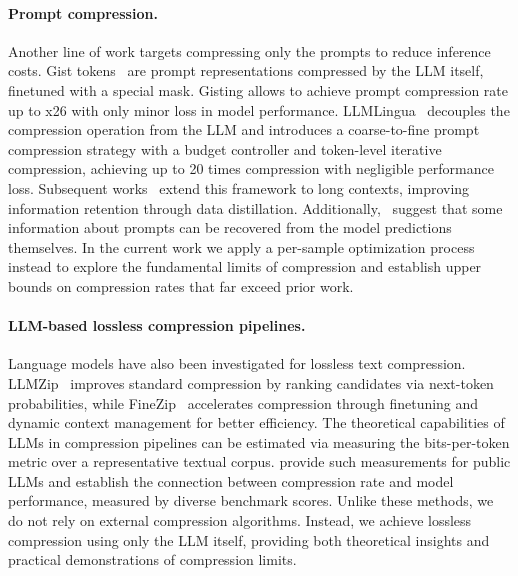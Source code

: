 \paragraph{Prompt compression.} Another line of work targets compressing only the prompts to reduce inference costs. Gist tokens~\cite{mu2023learning} are prompt representations compressed by the LLM itself, finetuned with a special mask. Gisting allows to achieve prompt compression rate up to x26 with only minor loss in model performance. LLMLingua~\cite{jiang2023llmlingua} decouples the compression operation from the LLM and introduces a coarse-to-fine prompt compression strategy with a budget controller and token-level iterative compression, achieving up to 20 times compression with negligible performance loss. Subsequent works~\cite{jiang2023longllmlingua2, pan2024llmlingua} extend this framework to long contexts, improving information retention through data distillation. 
Additionally,~\citet{morris2023language} suggest that some information about prompts can be recovered from the model predictions themselves. 
In the current work
we apply a per-sample optimization process instead to explore the fundamental limits of compression
and establish upper bounds on compression rates that far exceed prior work.

\paragraph{LLM-based lossless compression pipelines.} Language models have also been investigated for lossless text compression. LLMZip~\cite{valmeekam2023llmzip} improves standard compression by ranking candidates via next-token probabilities, while FineZip~\cite{mittu2024finezip} accelerates compression through finetuning and dynamic context management for better efficiency.
The theoretical capabilities of LLMs in compression pipelines can be estimated via measuring the bits-per-token metric over a representative textual corpus. \citet{huang2024compression, guo2024ranking} provide such measurements for public LLMs and establish the connection between compression rate and model performance, measured by diverse benchmark scores. 
Unlike these methods, we do not rely on external compression algorithms. Instead, we achieve lossless compression using only the LLM itself, providing both theoretical insights and practical demonstrations of compression limits.


